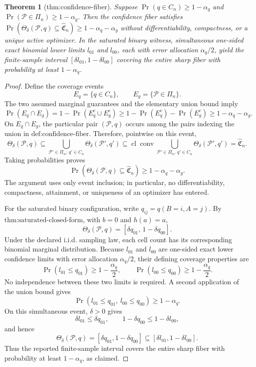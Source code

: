 \documentclass{article}
\newtheorem{theorem}{Theorem}
\begin{document}
\begin{theorem}[thm:confidence-fiber]\label{thm:confidence-fiber}
Suppose \(\Pr(q\in C_n)\ge1-\alpha_q\) and \(\Pr(\mathcal P\in\Pi_n)\ge1-\alpha_g\). Then the confidence fiber satisfies \(\Pr(\Theta_\delta(\mathcal P,q)\subseteq\widehat{\mathfrak C}_n)\ge1-\alpha_q-\alpha_g\) without differentiability, compactness, or a unique active optimizer. In the saturated binary witness, simultaneous one-sided exact binomial lower limits \(l_{01}\) and \(l_{00}\), each with error allocation \(\alpha_q/2\), yield the finite-sample interval \([\delta l_{01},1-\delta l_{00}]\) covering the entire sharp fiber with probability at least \(1-\alpha_q\).
\end{theorem}
\begin{proof}
Define the coverage events
\[
E_q=\{q\in C_n\},\qquad E_g=\{\mathcal P\in\Pi_n\}.
\]
The two assumed marginal guarantees and the elementary union bound imply
\[
\Pr(E_q\cap E_g)
=1-\Pr(E_q^c\cup E_g^c)
\geq1-\Pr(E_q^c)-\Pr(E_g^c)
\geq1-\alpha_q-\alpha_g.
\]
On \(E_q\cap E_g\), the particular pair \((\mathcal P,q)\) occurs among the pairs indexing the union in \(\text{def:confidence-fiber}\).  Therefore, pointwise on this event,
\[
\Theta_\delta(\mathcal P,q)
\subseteq
\bigcup_{\mathcal P'\in\Pi_n,\,q'\in C_n}
\Theta_\delta(\mathcal P',q')
\subseteq
\operatorname{cl}\operatorname{conv}
\bigcup_{\mathcal P'\in\Pi_n,\,q'\in C_n}
\Theta_\delta(\mathcal P',q')
=\widehat{\mathfrak C}_n.
\]
Taking probabilities proves
\[
\Pr\!\left(\Theta_\delta(\mathcal P,q)\subseteq\widehat{\mathfrak C}_n\right)
\geq1-\alpha_q-\alpha_g.
\]
The argument uses only event inclusion; in particular, no differentiability, compactness, attainment, or uniqueness of an optimizer has entered.

For the saturated binary configuration, write \(q_{ij}=q(B=i,A=j)\).  By \(\text{thm:saturated-closed-form}\), with \(b=0\) and \(h(a)=a\),
\[
\Theta_\delta(\mathcal P,q)=[\delta q_{01},\,1-\delta q_{00}].
\]
Under the declared i.i.d. sampling law, each cell count has its corresponding binomial marginal distribution.  Because \(l_{01}\) and \(l_{00}\) are one-sided exact lower confidence limits with error allocation \(\alpha_q/2\), their defining coverage properties are
\[
\Pr(l_{01}\leq q_{01})\geq1-\frac{\alpha_q}{2},
\qquad
\Pr(l_{00}\leq q_{00})\geq1-\frac{\alpha_q}{2}.
\]
No independence between these two limits is required.  A second application of the union bound gives
\[
\Pr(l_{01}\leq q_{01},\ l_{00}\leq q_{00})\geq1-\alpha_q.
\]
On this simultaneous event, \(\delta>0\) gives
\[
\delta l_{01}\leq\delta q_{01},
\qquad
1-\delta q_{00}\leq1-\delta l_{00},
\]
and hence
\[
\Theta_\delta(\mathcal P,q)
=[\delta q_{01},1-\delta q_{00}]
\subseteq[\delta l_{01},1-\delta l_{00}].
\]
Thus the reported finite-sample interval covers the entire sharp fiber with probability at least \(1-\alpha_q\), as claimed.
\end{proof}
\end{document}
